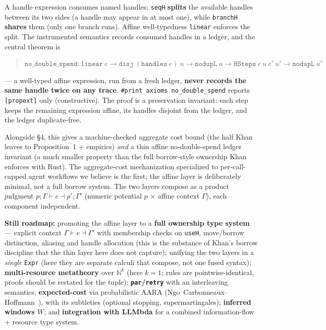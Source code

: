 \documentclass[11pt]{article}
\theoremstyle{plain}
\begin{document}
A handle expression consumes named handles; \texttt{seqH} \textbf{splits} the available handles
between its two sides (a handle may appear in at most one), while \texttt{branchH} \textbf{shares}
them (only one branch runs). Affine well-typedness \texttt{linear} enforces the split. The
instrumented semantics records consumed handles in a ledger, and the central theorem is
\begin{quote}
$\texttt{no\_double\_spend} : \texttt{linear}\ e \to \texttt{disj}\ (\texttt{handles}\ e)\ u \to
\texttt{nodupL}\ u \to \texttt{HSteps}\ e\ u\ e'\ u' \to \texttt{nodupL}\ u'$
\end{quote}
--- a well-typed affine expression, run from a fresh ledger, \textbf{never records the same handle
twice on any trace}. \texttt{\#print axioms no\_double\_spend} reports \texttt{[propext]} only
(constructive). The proof is a preservation invariant: each step keeps the remaining expression
affine, its handles disjoint from the ledger, and the ledger duplicate-free.

Alongside \S4, this gives a machine-checked aggregate cost bound (the half Khan leaves to
Proposition~1 + empirics) \emph{and} a thin affine no-double-spend ledger invariant (a much smaller
property than the full borrow-style ownership Khan enforces with Rust). The aggregate-cost
mechanization specialized to per-call-capped agent workflows we believe is the first; the affine
layer is deliberately minimal, not a full borrow system. The two layers compose as a product
judgment $p; \Gamma \vdash e \dashv p'; \Gamma'$ (numeric potential $p$ $\times$ affine context
$\Gamma$), each component independent.

\textbf{Still roadmap:} promoting the affine layer to a \textbf{full ownership type system} ---
explicit context $\Gamma \vdash e \dashv \Gamma'$ with membership checks on \texttt{useH},
move/borrow distinction, aliasing and handle allocation (this is the substance of Khan's borrow
discipline that the thin layer here does not capture); unifying the two layers in a \emph{single}
\texttt{Expr} (here they are separate calculi that compose, not one fused syntax);
\textbf{multi-resource metatheory} over $\mathbb{N}^k$ (here $k = 1$; rules are
pointwise-identical, proofs should be restated for the tuple); \textbf{\texttt{par}/\texttt{retry}}
with an interleaving semantics; \textbf{expected-cost} via probabilistic AARA
(Ngo--Carbonneaux--Hoffmann~\cite{ngo2018}), with its subtleties (optional stopping,
supermartingales); \textbf{inferred windows $W$}; and \textbf{integration with LLMbda} for a
combined information-flow + resource type system.
\end{document}
